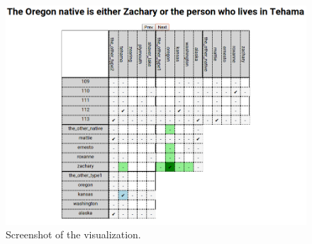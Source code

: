 \begin{figure}
 \includegraphics[width=\columnwidth]{fig/screenshot.png}
 \caption{Screenshot of the visualization.}
 \label{fig:screenshot}
\end{figure}




% 
